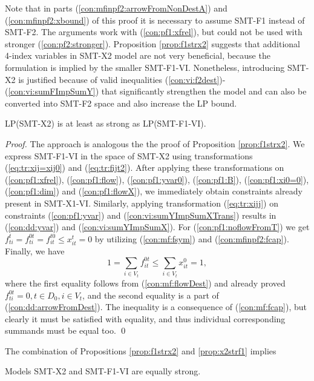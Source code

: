 Note that in parts (\ref{con:mfinpf2:arrowFromNonDestA}) and (\ref{con:mfinpf2:xbound}) of this proof it is necessary to assume SMT-F1 instead of SMT-F2. The arguments work with (\ref{con:pf1:xfrel}), but could not be used with stronger (\ref{con:pf2:stronger}).
Proposition \ref{prop:f1strx2} suggests that additional 4-index variables in SMT-X2 model are not very beneficial, because the formulation is implied by the smaller SMT-F1-VI. Nonetheless, introducing SMT-X2 is justified because of valid inequalities (\ref{con:vi:f2dest})-(\ref{con:vi:sumFImpSumY}) that significantly strengthen the model and can also be converted into SMT-F2 space and also increase the LP bound.
\begin{prop}
\label{prop:x2strf1}
LP(SMT-X2) is at least as strong as LP(SMT-F1-VI). 
\end{prop}
\begin{proof}
The approach is analogous the the proof of Proposition \ref{prop:f1strx2}. We express SMT-F1-VI in the space of SMT-X2 using transformations (\ref{eq:tr:xij=xij0}) and (\ref{eq:tr:fijt2}). After applying these transformations on (\ref{con:pf1:xfrel}), (\ref{con:pf1:flow}), (\ref{con:pf1:yvar0}), (\ref{con:pf1:B}), (\ref{con:pf1:xi0=0}), (\ref{con:pf1:dim}) and (\ref{con:pf1:flowX}), we immediately obtain constraints already present in SMT-X1-VI. Similarly, applying transformation (\ref{eq:tr:xijj}) on constraints (\ref{con:pf1:yvar}) and (\ref{con:vi:sumYImpSumXTrans}) results in (\ref{con:dd:yvar}) and (\ref{con:vi:sumYImpSumX}). For (\ref{con:pf1:noflowFromT}) we get $f^t_{ti}=f^{0t}_{ti}=f^{t0}_{it}\leq x^t_{it}=0$ by utilizing (\ref{con:mf:fsym}) and (\ref{con:mfinpf2:fcap}). Finally, we have $$1=\sum_{i\in V_t}f^{0t}_{it}\leq \sum_{i\in V_t}x^0_{it}=1,$$ where the first equality follows from (\ref{con:mf:flowDest}) and already proved $f^{0t}_{ti}=0, t\in D_0,i\in V_t$, and the second equality is a part of (\ref{con:dd:arrowFromDest}). The inequality is a consequence of (\ref{con:mf:fcap}), but clearly it must be satisfied with equality, and thus individual corresponding summands must be equal too. 
\qed
\end{proof}
The combination of Propositions \ref{prop:f1strx2} and \ref{prop:x2strf1} implies
\begin{corollary}
Models SMT-X2 and SMT-F1-VI are equally strong.
\end{corollary}
